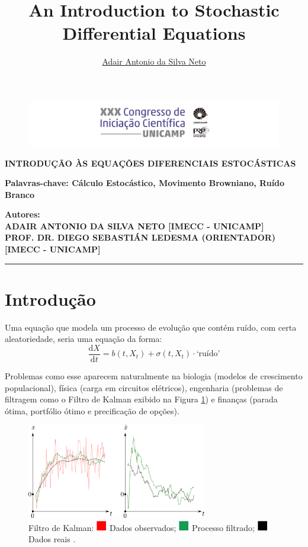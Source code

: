 \documentclass[12pt,a4paper]{article}
\author{\href{https://github.com/adairneto}{Adair Antonio da Silva Neto}}
\title{An Introduction to Stochastic Differential Equations}
\newcommand\crule[3][black]{\textcolor{#1}{\rule{#2}{#3}}}
\theoremstyle{definition}
\begin{document}

\begin{figure}[h]
  \centering
    \includegraphics[width=\textwidth]{logo.png}
\end{figure}

\begin{center}
	\LARGE
	\textbf{\uppercase{Introdução às Equações Diferenciais Estocásticas}}
	
	\normalsize
	\textbf{Palavras-chave: Cálculo Estocástico, Movimento Browniano, Ruído Branco}
\end{center}
\begin{flushright}
	\normalsize
	\textbf{Autores: \\
	\uppercase{Adair Antonio da Silva Neto [IMECC - UNICAMP]} \\
	\uppercase{Prof. Dr. Diego Sebastián Ledesma (orientador) [IMECC - UNICAMP]}}
\end{flushright}

\hrule

\section*{Introdução}

Uma equação que modela um processo de evolução que contém ruído, com certa aleatoriedade, seria uma equação da forma:
\begin{equation}\label{eq:sde}
	\frac{\mathrm{d}X}{\mathrm{d}t} = b(t,X_t) + \sigma(t,X_t)\cdot \text{`ruído'}
\end{equation}

Problemas como esse aparecem naturalmente na biologia (modelos de crescimento populacional), física (carga em circuitos elétricos), engenharia (problemas de filtragem como o Filtro de Kalman exibido na Figura \ref{fig:kalman}) e finanças (parada ótima, portfólio ótimo e precificação de opções). 

\begin{figure}[H]
  \centering
    \includegraphics[width=0.7\textwidth]{Kalman.png} 
    \caption{Filtro de Kalman: $\crule[red]{0.4cm}{0.4cm}$ Dados observados; $\crule[ForestGreen]{0.4cm}{0.4cm}$ Processo filtrado; $\crule{0.4cm}{0.4cm}$ Dados reais \cite{wiki:Kalman_filter}.}
    \label{fig:kalman}
\end{figure}
\end{document}
